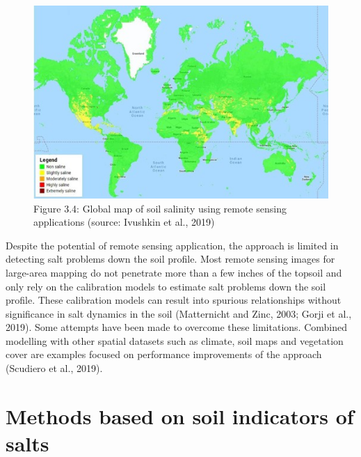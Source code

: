 \documentclass[
  10pt,
  b5paper,
]{book}
\begin{document}
\begin{figure}
\centering
\includegraphics{figures/images/Figure3.f.jpg}
\caption{Figure 3.4: Global map of soil salinity using remote sensing applications (source: Ivushkin et al., 2019)}
\end{figure}

Despite the potential of remote sensing application, the approach is limited in detecting salt problems down the soil profile. Most remote sensing images for large-area mapping do not penetrate more than a few inches of the topsoil and only rely on the calibration models to estimate salt problems down the soil profile. These calibration models can result into spurious relationships without significance in salt dynamics in the soil (Matternicht and Zinc, 2003; Gorji et al., 2019). Some attempts have been made to overcome these limitations. Combined modelling with other spatial datasets such as climate, soil maps and vegetation cover are examples focused on performance improvements of the approach (Scudiero et al., 2019).

\hypertarget{methods-based-on-soil-indicators-of-salts}{%
\section{Methods based on soil indicators of salts}\label{methods-based-on-soil-indicators-of-salts}}
\end{document}

